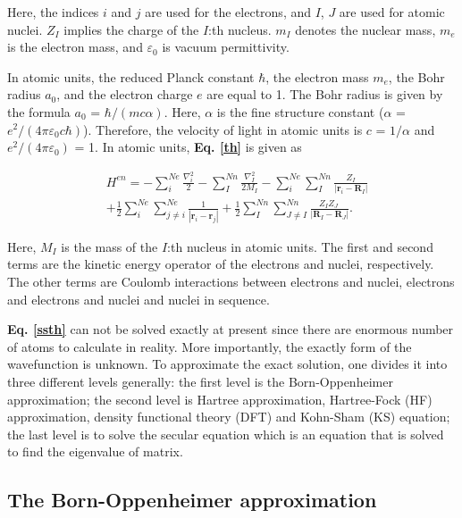 \documentclass[a4paper, 12pt, titlepage,oneside,drop]{kthesis}
\begin{document}
Here, the indices $i$ and $j$ are used for the electrons, and $I$, $J$ are used for atomic nuclei. $Z_I$ implies the charge of the $I$:th nucleus.
$m_I$ denotes the nuclear mass, $m_e$ is the electron mass, and $\varepsilon_0$ is vacuum permittivity.

In atomic units, the reduced Planck constant $\hbar$, the electron mass $m_e$, the Bohr radius $a_0$, and the electron charge
$e$ are equal to 1. The Bohr radius is given by the formula $a_0$ = ${\hbar} / {(mc\alpha)}$. Here, $\alpha$ is the fine structure
constant ($\alpha$ = ${e^2}/{(4 \pi \varepsilon_0 c \hbar)}$). Therefore, the velocity of light in atomic units is $c$ = $1/{\alpha}$ and ${e^2}/{(4 \pi \varepsilon_0)}$ = 1. In atomic units, \textbf{Eq. \ref{th}} is given as 

\begin{equation}\label{sth}\begin{split}
& H^{en} = - \sum\limits_i^{Ne}   \frac{{{\nabla}_{{i}}^{2}}}{2} - \sum\limits_I^{Nn} \frac{{{\nabla}_{{I}}^{2}}}{2 M_{I}}  - \sum\limits_i^{Ne} \sum\limits_I^{Nn} \frac{Z_{I}}{|\textbf{r}_{i}-\textbf{R}_{I}|} \\
& + \frac{1}{2} \sum\limits_i^{Ne} \sum\limits_{j \neq i}^{Ne} \frac{1}{ |\textbf{r}_{i}-\textbf{r}_{j}|} + \frac{1}{2} \sum\limits_I^{Nn} \sum\limits_{J \neq I}^{Nn} \frac{Z_{I} Z_{J}\ }{|\textbf{R}_{I}-\textbf{R}_{J}|}.
\end{split}\end{equation}

Here, $M_I$ is the mass of the $I$:th nucleus in atomic units. The first and second terms are the kinetic energy operator of the electrons and nuclei, respectively.
The other terms are Coulomb interactions between electrons and nuclei, electrons and electrons and nuclei and nuclei in sequence.

\textbf{Eq. \ref{ssth}} can not be solved exactly at present since there are enormous number of atoms to calculate in reality. More importantly, the exactly form of the wavefunction is unknown.
To approximate the exact solution, one divides it into three different levels generally: the first level is the Born-Oppenheimer approximation; the second level is Hartree approximation,
Hartree-Fock (HF) approximation, density functional theory (DFT) and Kohn-Sham (KS) equation; the last level is to solve the secular equation which is an equation that is solved to find the eigenvalue of matrix.

\subsection{The Born-Oppenheimer approximation}
\label{ch:boa}
\end{document}
